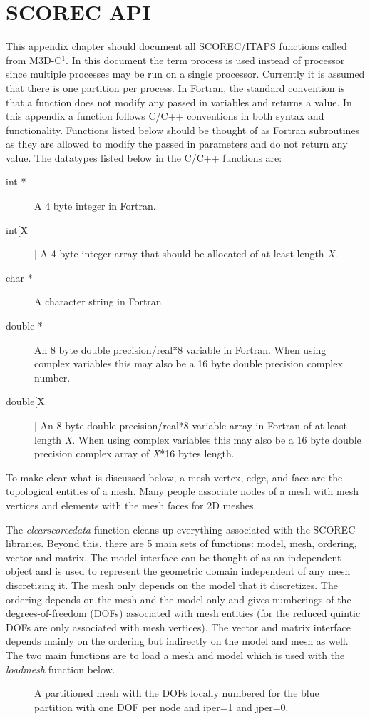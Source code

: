 \section{SCOREC API}
This appendix chapter should document all SCOREC/ITAPS functions called from M3D-C$^1$. 
In this document the term process is used instead of processor since multiple processes
may be run on a single processor.  Currently it is assumed that there is
one partition per process.  In Fortran, the standard convention
is that a function does not modify any passed in variables and returns a value. 
In this appendix a function follows C/C++ conventions in both syntax and functionality. 
Functions listed below should be thought of as Fortran subroutines as they are allowed
to modify the passed in parameters and do not return any value. 
The datatypes listed below in the C/C++ functions are:
\begin{description}
\item[int *] A 4 byte integer in Fortran.
\item[int[X]] A 4 byte integer array that should be allocated of at least length \textit{X}.
\item[char *] A character string in Fortran.
\item[double *] An 8 byte double precision/real*8 variable in Fortran. When using complex variables this may also be a 16 byte double precision complex number.  
\item[double[X]]  An 8 byte double precision/real*8 variable array in Fortran of at least length \textit{X}.  When using complex variables this may also be a 16 byte double precision complex array of \textit{X}*16 bytes length.
\end{description}
To make clear what is discussed below, a mesh vertex, edge, and face are the topological
entities of a mesh.  Many people associate nodes of a mesh with mesh vertices and elements with
the mesh faces for 2D meshes.  

The \textit{clearscorecdata} function cleans up everything associated with the SCOREC libraries.
Beyond this, there are 5 main sets of functions: model, mesh, ordering, vector and matrix.  The model
interface can be thought of as an independent object and is used to represent the geometric domain independent
of any mesh discretizing it.  The mesh only depends on the model that it discretizes.  The ordering
depends on the mesh and the model only and gives numberings of the degrees-of-freedom (DOFs) associated
with mesh entities (for the reduced quintic DOFs are only associated with mesh vertices).  The vector
and matrix interface depends mainly on the ordering but indirectly on the model and mesh as well.
 The two main functions
are to load a mesh and model which is used with the \textit{loadmesh} function below.  
\begin{center}
\begin{figure}
\caption{A partitioned mesh with the DOFs locally numbered for the blue partition with one DOF per node and iper=1 and jper=0.}\label{meshpartition} \end{figure}
\end{center}



